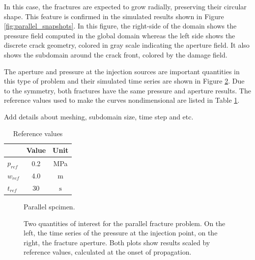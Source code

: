 In this case, the fractures are expected to grow radially, preserving their circular shape. This feature is confirmed in the simulated results shown in Figure \ref{fig:parallel_snapshots}. In this figure, the right-side of the domain shows the pressure field computed in the global domain whereas the left side shows the discrete crack geometry, colored in gray scale indicating the aperture field. It also shows the subdomain around the crack front, colored by the damage field.

The aperture and pressure at the injection sources are important quantities in this type of problem and their simulated time series are shown in Figure \ref{fig:parallel_fracs_charts}. Due to the symmetry, both fractures have the same pressure and aperture results. The reference values used to make the curves nondimensional are listed in Table \ref{parallel_refs}.

Add details about meshing, subdomain size, time step and etc.

\begin{table}[ht]
  \centering
  \caption{Reference values}
  \begin{tabular}[t]{lcc}
  \hline
  &Value &Unit \\
  \hline
  $p_{ref}$&0.2&MPa\\
  $w_{ref}$&4.0&m\\
  $t_{ref}$&30&$\text{s}$\\
  \hline
  \end{tabular}
  \label{parallel_refs}
\end{table}%

\begin{figure}[ht]
  \centering
  \caption{Parallel spcimen.}
  \label{fig:parallel_schematic}
\end{figure}


\begin{figure}[h]
  \noindent
  \hspace{0.5cm}
  
  \caption{Two quantities of interest for the parallel fracture problem. On the left, the time series of the pressure at the injection point, on the right, the fracture aperture. Both plots show results scaled by reference values, calculated at the onset of propagation.}  
  \label{fig:parallel_fracs_charts}
\end{figure}


